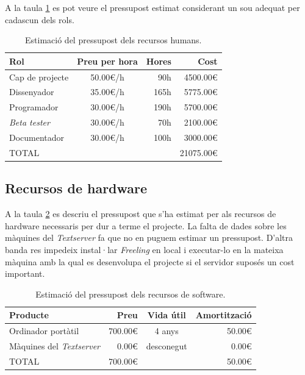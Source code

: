 A la taula \ref{tab:recursos_humans} es pot veure el pressupost estimat considerant un sou adequat per cadascun dels rols.

\begin{table}[!htb]
    \centering
    \begin{tabular}{|l||c|r|r|}
        \hline
         Rol & Preu per hora & Hores & Cost \\
         \hline\hline
         Cap de projecte & 50.00€/h & 90h & 4500.00€ \\
         Dissenyador & 35.00€/h & 165h & 5775.00€ \\
         Programador & 30.00€/h & 190h & 5700.00€ \\
         \emph{Beta tester} & 30.00€/h & 70h & 2100.00€ \\
         Documentador & 30.00€/h & 100h & 3000.00€ \\
         \hline\hline
         TOTAL & & & 21075.00€ \\
         \hline
    \end{tabular}
    \caption{Estimació del pressupost dels recursos humans.}
    \label{tab:recursos_humans}
\end{table}

\subsection{Recursos de hardware}

A la taula \ref{tab:recursos_hardware} es descriu el pressupost que s'ha estimat per als recursos de hardware necessaris per dur a terme el projecte. La falta de dades sobre les màquines del \emph{Textserver} fa que no en puguem estimar un pressupost. D'altra banda res impedeix instal·lar \emph{Freeling} en local i executar-lo en la mateixa màquina amb la qual es desenvolupa el projecte si el servidor suposés un cost important.

\begin{table}[]
    \centering
    \begin{tabular}{|l||r|c|r|}
        \hline
         Producte & Preu & Vida útil & Amortització \\
         \hline\hline
         Ordinador portàtil & 700.00€ & 4 anys & 50.00€ \\
         Màquines del \emph{Textserver} & 0.00€ & desconegut & 0.00€ \\
         \hline\hline
         TOTAL & 700.00€ & & 50.00€ \\
         \hline
    \end{tabular}
    \caption{Estimació del pressupost dels recursos de software.}
    \label{tab:recursos_hardware}
\end{table}

